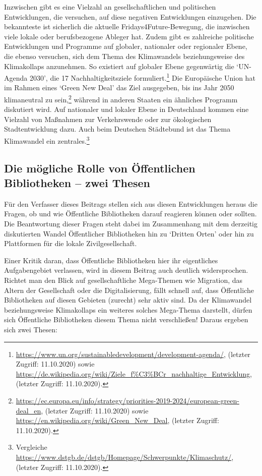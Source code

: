 \documentclass[a4paper,
fontsize=11pt,
oneside,
numbers=noperiodatend,
parskip=half-,
bibliography=totoc,
final
]{scrartcl}
\begin{document}
Inzwischen gibt es eine Vielzahl an gesellschaftlichen und politischen
Entwicklungen, die versuchen, auf diese negativen Entwicklungen
einzugehen. Die bekannteste ist sicherlich die aktuelle
Fridays4Future-Bewegung, die inzwischen viele lokale oder berufsbezogene
Ableger hat. Zudem gibt es zahlreiche politische Entwicklungen und
Programme auf globaler, nationaler oder regionaler Ebene, die ebenso
versuchen, sich dem Thema des Klimawandels beziehungsweise des
Klimakollaps anzunehmen. So existiert auf globaler Ebene gegenwärtig die
\enquote*{UN-Agenda 2030}, die 17 Nachhaltigkeitsziele
formuliert.\footnote{\url{https://www.un.org/sustainabledevelopment/development-agenda/},
  (letzter Zugriff: 11.10.2020) sowie
  \url{https://de.wikipedia.org/wiki/Ziele_f\%C3\%BCr_nachhaltige_Entwicklung},
  (letzter Zugriff: 11.10.2020).} Die Europäische Union hat im Rahmen
eines \enquote*{Green New Deal} das Ziel ausgegeben, bis ins Jahr 2050
klimaneutral zu sein,\footnote{\url{https://ec.europa.eu/info/strategy/priorities-2019-2024/european-green-deal_en},
  (letzter Zugriff: 11.10.2020) sowie
  \url{https://en.wikipedia.org/wiki/Green_New_Deal}, (letzter Zugriff:
  11.10.2020).} während in anderen Staaten ein ähnliches Programm
diskutiert wird. Auf nationaler und lokaler Ebene in Deutschland kommen
eine Vielzahl von Maßnahmen zur Verkehrswende oder zur ökologischen
Stadtentwicklung dazu. Auch beim Deutschen Städtebund ist das Thema
Klimawandel ein zentrales.\footnote{Vergleiche
  \url{https://www.dstgb.de/dstgb/Homepage/Schwerpunkte/Klimaschutz/},
  (letzter Zugriff: 11.10.2020).}

\hypertarget{die-muxf6gliche-rolle-von-uxf6ffentlichen-bibliotheken-zwei-thesen}{%
\subsection{Die mögliche Rolle von Öffentlichen Bibliotheken -- zwei
Thesen}\label{die-muxf6gliche-rolle-von-uxf6ffentlichen-bibliotheken-zwei-thesen}}

Für den Verfasser dieses Beitrags stellen sich aus diesen Entwicklungen
heraus die Fragen, ob und wie Öffentliche Bibliotheken darauf reagieren
können oder sollten. Die Beantwortung dieser Fragen steht dabei im
Zusammenhang mit dem derzeitig diskutierten Wandel Öffentlicher
Bibliotheken hin zu \enquote*{Dritten Orten} oder hin zu Plattformen für
die lokale Zivilgesellschaft.

Einer Kritik daran, dass Öffentliche Bibliotheken hier ihr eigentliches
Aufgabengebiet verlassen, wird in diesem Beitrag auch deutlich
widersprochen. Richtet man den Blick auf gesellschaftliche Mega-Themen
wie Migration, das Altern der Gesellschaft oder die Digitalisierung,
fällt schnell auf, dass Öffentliche Bibliotheken auf diesen Gebieten
(zurecht) sehr aktiv sind. Da der Klimawandel beziehungsweise
Klimakollaps ein weiteres solches Mega-Thema darstellt, dürfen sich
Öffentliche Bibliotheken diesem Thema nicht verschließen! Daraus ergeben
sich zwei Thesen:
\end{document}
